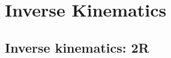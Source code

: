 \chapter{Inverse Kinematics}
\label{ch:ik}


\section{Inverse kinematics: 2R}
\label{sec:ik-2r-planar}

